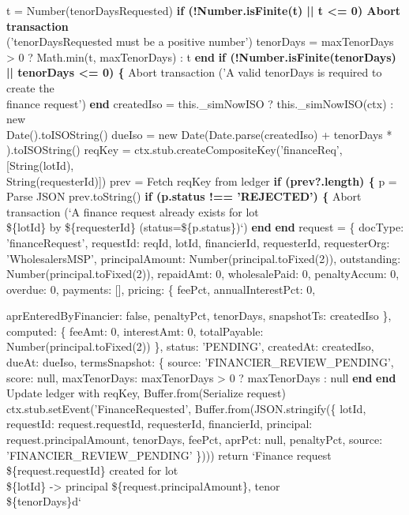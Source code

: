 \documentclass[12pt]{article}
\begin{document}
\begin{algorithm}[H]
\caption{createFinanceRequestForLot() (Part 2 of 3)}
t = Number(tenorDaysRequested)\;
\textbf{if (!Number.isFinite(t) || t <= 0) Abort transaction}\\
\quad ('tenorDaysRequested must be a positive number')\;
tenorDays = maxTenorDays > 0 ? Math.min(t, maxTenorDays) : t\;
\textbf{end}\;
\textbf{if (!Number.isFinite(tenorDays) || tenorDays <= 0) \{}\;
Abort transaction ('A valid tenorDays is required to create the\\
\quad finance request')\;
\textbf{end}\;
createdIso = this.\_simNowISO ? this.\_simNowISO(ctx) : new\\
\quad Date().toISOString()\;
dueIso = new Date(Date.parse(createdIso) + tenorDays *\\
).toISOString()\;
reqKey = ctx.stub.createCompositeKey('financeReq', [String(lotId),\\
\quad String(requesterId)])\;
prev = Fetch reqKey from ledger\;
\textbf{if (prev?.length) \{}\;
p = Parse JSON prev.toString()\;
\textbf{if (p.status !== 'REJECTED') \{}\;
Abort transaction (`A finance request already exists for lot\\
\quad \$\{lotId\} by \$\{requesterId\} (status=\$\{p.status\})`)\;
\textbf{end}\;
\textbf{end}\;
request = \{\;
docType: 'financeRequest',\;
requestId: reqId,\;
lotId,\;
financierId,\;
requesterId,\;
requesterOrg: 'WholesalersMSP',\;
principalAmount: Number(principal.toFixed(2)),\;
outstanding: Number(principal.toFixed(2)),\;
repaidAmt: 0,\;
wholesalePaid: 0,\;
penaltyAccum: 0,\;
overdue: 0,\;
payments: [],\;
pricing: \{\;
feePct,\;
annualInterestPct: 0,\;
\end{algorithm}


\begin{algorithm}[H]
\caption{createFinanceRequestForLot() (Part 3 of 3)}
aprEnteredByFinancier: false,\;
penaltyPct,\;
tenorDays,\;
snapshotTs: createdIso\;
\},\;
computed: \{\;
feeAmt: 0,\;
interestAmt: 0,\;
totalPayable: Number(principal.toFixed(2))\;
\},\;
status: 'PENDING',\;
createdAt: createdIso,\;
dueAt: dueIso,\;
termsSnapshot: \{\;
source: 'FINANCIER\_REVIEW\_PENDING',\;
score: null,\;
maxTenorDays: maxTenorDays > 0 ? maxTenorDays : null\;
\textbf{end}\;
\textbf{end}\;
Update ledger with reqKey, Buffer.from(Serialize request)\;
ctx.stub.setEvent('FinanceRequested', Buffer.from(JSON.stringify(\{\;
lotId,\;
requestId: request.requestId,\;
requesterId,\;
financierId,\;
principal: request.principalAmount,\;
tenorDays,\;
feePct,\;
aprPct: null,\;
penaltyPct,\;
source: 'FINANCIER\_REVIEW\_PENDING'\;
\})))\;
return `Finance request \$\{request.requestId\} created for lot\\
\quad \$\{lotId\} -> principal \$\{request.principalAmount\}, tenor\\
\quad \$\{tenorDays\}d`\;
\end{algorithm}
\end{document}
